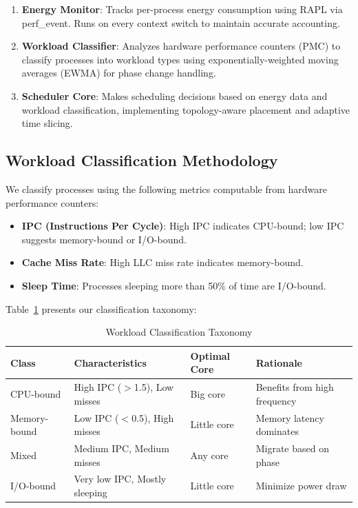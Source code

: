 \documentclass{article}
\begin{document}
\begin{enumerate}
    \item \textbf{Energy Monitor}: Tracks per-process energy consumption using RAPL via perf\_event. Runs on every context switch to maintain accurate accounting.
    
    \item \textbf{Workload Classifier}: Analyzes hardware performance counters (PMC) to classify processes into workload types using exponentially-weighted moving averages (EWMA) for phase change handling.
    
    \item \textbf{Scheduler Core}: Makes scheduling decisions based on energy data and workload classification, implementing topology-aware placement and adaptive time slicing.
\end{enumerate}

\subsection{Workload Classification Methodology}

We classify processes using the following metrics computable from hardware performance counters:

\begin{itemize}
    \item \textbf{IPC (Instructions Per Cycle)}: High IPC indicates CPU-bound; low IPC suggests memory-bound or I/O-bound.
    \item \textbf{Cache Miss Rate}: High LLC miss rate indicates memory-bound.
    \item \textbf{Sleep Time}: Processes sleeping more than 50\% of time are I/O-bound.
\end{itemize}

Table~\ref{tab:taxonomy} presents our classification taxonomy:

\begin{table}[t]
\caption{Workload Classification Taxonomy}
\label{tab:taxonomy}
\centering
\begin{tabular}{llll}
\toprule
Class & Characteristics & Optimal Core & Rationale \\
\midrule
CPU-bound & High IPC ($>$1.5), Low misses & Big core & Benefits from high frequency \\
Memory-bound & Low IPC ($<$0.5), High misses & Little core & Memory latency dominates \\
Mixed & Medium IPC, Medium misses & Any core & Migrate based on phase \\
I/O-bound & Very low IPC, Mostly sleeping & Little core & Minimize power draw \\
\bottomrule
\end{tabular}
\end{table}
\end{document}
